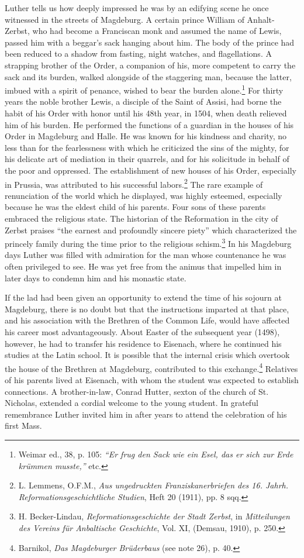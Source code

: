 Luther tells us how deeply impressed he was by an edifying scene
he once witnessed in the streets of Magdeburg. A certain prince
William of Anhalt-Zerbst, who had become a Franciscan monk and
assumed the name of Lewis, passed him with a beggar's sack hanging
about him. The body of the prince had been reduced to a shadow
from fasting, night watches, and flagellations. A strapping brother
of the Order, a companion of his, more competent to carry the sack
and its burden, walked alongside of the staggering man, because the
latter, imbued with a spirit of penance, wished to bear the burden
alone.\footnote{Weimar ed., 38, p. 105: \textit{“Er frug den Sack wie ein Esel, das er sich zur Erde krümmen musste,”} etc.}
For thirty years the noble brother Lewis, a disciple of the
Saint of Assisi, had borne the habit of his Order with honor until his
48th year, in 1504, when death relieved him of his burden. He performed
the functions of a guardian in the houses of his Order in
Magdeburg and Halle. He was known for his kindness and charity,
no less than for the fearlessness with which he criticized the sins of
the mighty, for his delicate art of mediation in their quarrels, and for
his solicitude in behalf of the poor and oppressed. The establishment
of new houses of his Order, especially in Prussia, was attributed to
his successful labors.\footnote{L. Lemmens, O.F.M., \textit{Aus ungedruckten Franziskanerbriefen des 16. Jahrh. Reformationsgeschichtliche Studien}, Heft 20 (1911), pp. 8 sqq.}
The rare example of renunciation of the world
which he displayed, was highly esteemed, especially because he was the
eldest child of his parents. Four sons of these parents embraced the religious state.
The historian of the Reformation in the city of Zerbst
praises “the earnest and profoundly sincere piety” which characterized the princely family during the time prior to the religious schism.\footnote{H. Becker-Lindau, \textit{Reformationsgeschichte der Stadt Zerbst}, in \textit{Mitteilungen des Vereins für Anbaltische Geschichte}, Vol. XI, (Demsau, 1910), p. 250.}
In his Magdeburg days Luther was filled with admiration for the man
whose countenance he was often privileged to see. He was yet free
from the animus that impelled him in later days to condemn him and
his monastic state.

If the lad had been given an opportunity to extend the time of his
sojourn at Magdeburg, there is no doubt but that the instructions
imparted at that place, and his association with the Brethren of the
Common Life, would have affected his career most advantageously.
About Easter of the subsequent year (1498), however, he had to
transfer his residence to Eisenach, where he continued his studies at
the Latin school. It is possible that the internal crisis which overtook
the house of the Brethren at Magdeburg, contributed to this exchange.\footnote{Barnikol, \textit{Das Magdeburger Brüderbaus} (see note 26), p. 40.}
Relatives of his parents lived at Eisenach, with whom the
student was expected to establish connections.
A brother-in-law, Conrad Hutter, sexton of the church of St. Nicholas, extended a cordial
welcome to the young student. In grateful remembrance Luther invited him in after years to attend the celebration of his first Mass.


